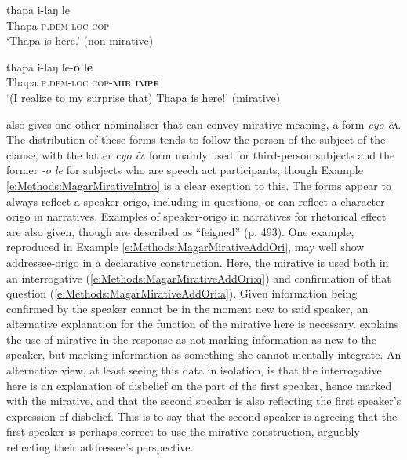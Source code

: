 \begin{exe}
  \ex\label{e:Methods:MagarMirativeIntro}
  \begin{xlist}
    \ex
    \gll thapa i-laŋ le \\
    Thapa \textsc{p.dem-loc} \textsc{cop} \\
    \glt `Thapa is here.' (non-mirative)

    \ex 
    \gll thapa i-laŋ le-\textbf{o} \textbf{le} \\
    Thapa \textsc{p.dem-loc} \textsc{cop-\textbf{mir}} \textsc{\textbf{impf}} \\
    \glt `(I realize to my surprise that) Thapa is here!' (mirative)
  \end{xlist}
  \cite[Magar,][480]{GrunowHarsta2008}
\end{exe}

 also gives one other nominaliser that can convey mirative meaning, a form \textit{cyo \~ cʌ}. The distribution of these forms tends to follow the person of the subject of the clause, with the latter \textit{cyo \~ cʌ} form mainly used for third-person subjects and the former \textit{-o le} for subjects who are speech act participants, though Example \ref{e:Methods:MagarMirativeIntro} is a clear exeption to this. The forms appear to always reflect a speaker-origo, including in questions, or can reflect a character origo in narratives. Examples of speaker-origo in narratives for rhetorical effect are also given, though are described as ``feigned'' (p. 493). One example, reproduced in Example \ref{e:Methods:MagarMirativeAddOri}, may well show addressee-origo in a declarative construction. Here, the mirative is used both in an interrogative (\ref{e:Methods:MagarMirativeAddOri:q}) and confirmation of that question (\ref{e:Methods:MagarMirativeAddOri:a}). Given information being confirmed by the speaker cannot be in the moment new to said speaker, an alternative explanation for the function of the mirative here is necessary.  explains the use of mirative in the response as not marking information as new to the speaker, but marking information as something she cannot mentally integrate. An alternative view, at least seeing this data in isolation, is that the interrogative here is an explanation of disbelief on the part of the first speaker, hence marked with the mirative, and that the second speaker is also reflecting the first speaker's expression of disbelief. This is to say that the second speaker is agreeing that the first speaker is perhaps correct to use the mirative construction, arguably reflecting their addressee's perspective.

